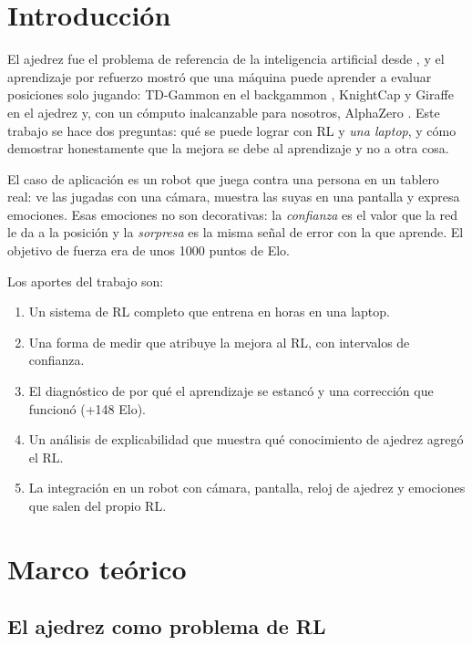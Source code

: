\documentclass[11pt,a4paper]{article}
\begin{document}
\setcounter{page}{1}

\section{Introducción}

El ajedrez fue el problema de referencia de la inteligencia artificial
desde \citet{shannon1950}, y el aprendizaje por refuerzo mostró que una
máquina puede aprender a evaluar posiciones solo jugando: TD-Gammon en el
backgammon \citep{tesauro1995}, KnightCap \citep{baxter2000} y Giraffe
\citep{lai2015} en el ajedrez y, con un cómputo inalcanzable para nosotros,
AlphaZero \citep{silver2018}. Este trabajo se hace dos preguntas: qué se
puede lograr con RL y \emph{una laptop}, y cómo demostrar honestamente que
la mejora se debe al aprendizaje y no a otra cosa.

El caso de aplicación es un robot que juega contra una persona en un tablero
real: ve las jugadas con una cámara, muestra las suyas en una pantalla y
expresa emociones. Esas emociones no son decorativas: la \emph{confianza}
es el valor que la red le da a la posición y la \emph{sorpresa} es la misma
señal de error con la que aprende. El objetivo de fuerza era de unos 1000
puntos de Elo.

Los aportes del trabajo son:
\begin{enumerate}
\item Un sistema de RL completo que entrena en horas en una laptop.
\item Una forma de medir que atribuye la mejora al RL, con intervalos de
  confianza.
\item El diagnóstico de por qué el aprendizaje se estancó y una corrección
  que funcionó (+148 Elo).
\item Un análisis de explicabilidad que muestra qué conocimiento de ajedrez
  agregó el RL.
\item La integración en un robot con cámara, pantalla, reloj de ajedrez y
  emociones que salen del propio RL.
\end{enumerate}

\section{Marco teórico}

\subsection{El ajedrez como problema de RL}
\end{document}

